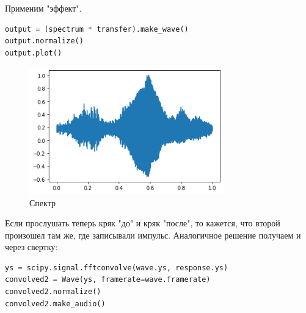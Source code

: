 \documentclass[a4paper,12pt]{report}
\begin{document}
    Применим "эффект".
    
\begin{lstlisting}[language=Python,caption=Трансформация]
output = (spectrum * transfer).make_wave()
output.normalize()
output.plot()
\end{lstlisting}

    \begin{figure}[H]
        \centering
        \includegraphics[width=0.75\textwidth]{images/ex2_horn_2.png}
        \caption{Спектр}
        \label{fig:ex2_horn_2}
    \end{figure}
    
    Если прослушать теперь кряк "до" и кряк "после", то кажется, что второй произошел там же, где записывали импульс. Аналогичное решение получаем и через свертку:
    
\begin{lstlisting}[language=Python,caption=Трансформация (х2)]
ys = scipy.signal.fftconvolve(wave.ys, response.ys)
convolved2 = Wave(ys, framerate=wave.framerate)
convolved2.normalize()
convolved2.make_audio()
\end{lstlisting}

    
\end{document}

